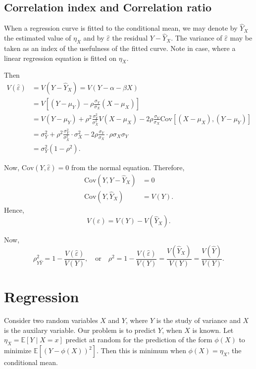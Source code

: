 \subsection{Correlation index and Correlation ratio}

When a regression curve is fitted to the conditional mean, we may denote by $\hat{Y}_X$ the estimated value of $\eta_X$ and by $\hat{\varepsilon}$ the residual $Y - \hat{Y}_X$. The variance of $\hat{\varepsilon}$ may be taken as an index of the usefulness of the fitted curve. Note in case, where a linear regression equation is fitted on $\eta_X$.

Then
\begin{align*}
    V(\hat{\varepsilon}) &= V(Y - \hat{Y}_X) = V(Y - \alpha - \beta X)\\
    &= V\left[ (Y - \mu_Y) - \rho \frac{\sigma_Y}{\sigma_X} (X - \mu_X) \right]\\
    &= V(Y - \mu_Y) + \rho^2 \frac{\sigma_Y^2}{\sigma_X^2} V(X - \mu_X) - 2\rho \frac{\sigma_Y}{\sigma_X} \text{Cov}\left[ (X - \mu_X), (Y - \mu_Y) \right]\\
    &= \sigma_Y^2 + \rho^2 \frac{\sigma_Y^2}{\sigma_X^2} \cdot \sigma_X^2 - 2\rho \frac{\sigma_Y}{\sigma_X} \cdot \rho \sigma_X \sigma_Y\\
    &= \sigma_Y^2 (1 - \rho^2).
\end{align*}

Now, $\text{Cov}(Y, \hat{\varepsilon}) = 0$ from the normal equation. Therefore,
\begin{align*}
    \text{Cov}(Y, Y - \hat{Y}_X) &= 0\\
    \text{Cov}(Y, \hat{Y}_X) &= V(Y).
\end{align*}
Hence,
\[
    V(\hat{\varepsilon}) = V(Y) - V(\hat{Y}_X).
\]

Now,
\[
    \rho^2_{Y\hat{Y}} = 1 - \frac{V(\hat{\varepsilon})}{V(Y)}, \quad \text{or} \quad \rho^2 = 1 - \frac{V(\hat{\varepsilon})}{V(Y)} = \frac{V(\hat{Y}_X)}{V(Y)} = \frac{V(\hat{Y})}{V(Y)}.
\]

\section{Regression}

Consider two random variables $X$ and $Y$, where $Y$ is the study of variance and $X$ is 
the auxilary variable. Our problem is to predict $Y$, when $X$ is known. 
Let $\eta_X = \mathbb{E}[Y \mid X = x]$ predict at random for the prediction of the form $\phi(X)$ to minimize $\mathbb{E}[(Y - \phi(X))^2]$. Then this is minimum when $\phi(X) = \eta_X$, the conditional mean.

